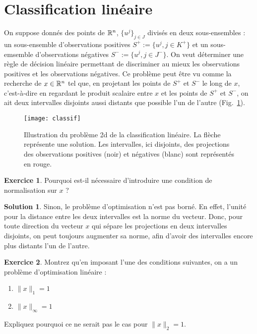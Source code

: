 \documentclass[a4paper,francais]{article}
\newcommand{\R}{{\ensuremath\mathbb{R}}}
\theoremstyle{definition}
\newtheorem{exercice}{Exercice}[section]
\newtheorem*{solution}{Solution}
\begin{document}
\section{Classification linéaire}
\label{sec:classif}

On suppose donnés des points de $\R^n$, $\{u^j\}_{j \in J}$ divisés en deux sous-ensembles :
un sous-ensemble d'observations positives $S^+ := \{ u^j, j \in K^+ \}$ et un sous-emsemble
d'observations négatives $S^- := \{ u^j, j \in J^- \}$. On veut déterminer une règle de décision linéaire
permettant de discriminer au mieux les observations positives et les observations négatives. Ce problème
peut être vu comme la recherche de $x \in \R^n$ tel que, en projetant les points de $S^+$ et $S^-$ le
long de $x$, c'est-à-dire en regardant le produit scalaire entre $x$ et les points de $S^+$ et $S^-$,
on ait deux intervalles disjoints aussi distants que possible l'un de l'autre (Fig.~\ref{fig:classif}).

\begin{figure}
  \centering
  \texttt{[image: classif]}
  \caption{Illustration du problème 2d de la classification linéaire.
    La flèche représente une solution.
    Les intervalles, ici disjoints, des projections des observations
    positives (noir) et négatives (blanc) sont représentés en rouge.  }
  \label{fig:classif}
\end{figure}

\begin{exercice}
  Pourquoi est-il nécessaire d'introduire une condition de normalisation sur $x$ ?
\end{exercice}

\begin{solution}
  Sinon, le problème d'optimisation n'est pas borné. En effet, l'unité pour la distance entre les deux
  intervalles est la norme du vecteur. Donc, pour toute direction du vecteur $x$ qui sépare les
  projections en deux intervalles disjoints, on peut toujours augmenter sa norme, afin d'avoir des
  intervalles encore plus distants l'un de l'autre.  
\end{solution}

\begin{exercice}
  Montrez qu'en imposant l'une des conditions suivantes, on a un problème d'optimisation linéaire :
  \begin{enumerate}
  \item\label{L1} $\|x\|_1 = 1$
  \item\label{Linf} $\|x\|_\infty = 1$
  \end{enumerate}
  Expliquez pourquoi ce ne serait pas le cas pour $\|x\|_2 = 1$.
\end{exercice}
\end{document}
